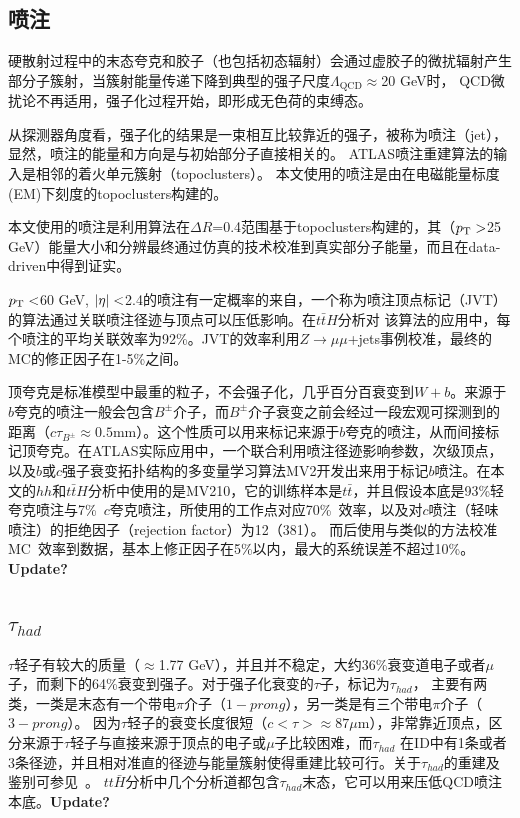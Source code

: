 \subsection{喷注}\label{subsec:jet_reco}
硬散射过程中的末态夸克和胶子（也包括初态辐射）会通过虚胶子的微扰辐射产生部分子簇射，当簇射能量传递下降到典型的强子尺度$\Lambda_{\text{QCD}}\approx$20 GeV时，%
QCD微扰论不再适用，强子化过程开始，即形成无色荷的束缚态。

从探测器角度看，强子化的结果是一束相互比较靠近的强子，被称为喷注（jet），显然，喷注的能量和方向是与初始部分子直接相关的。
ATLAS喷注重建算法的输入是相邻的着火单元簇射（topoclusters）\cite{Aad:2016upy}。
本文使用的喷注是由在电磁能量标度(EM)下刻度的topoclusters构建的。

本文使用的喷注是利用\antikt 算法\cite{Cacciari:2008gp}在$\Delta R$=0.4范围基于topoclusters构建的，其（$p_{\text{T}}>$25 GeV）能量大小和分辨最终通过仿真的技术校准到真实部分子能量，而且在data-driven中得到证实\cite{TheATLAScollaboration:2015soq,TheATLAScollaboration:2013pia}。

$p_{\text{T}}<$60 GeV, $|\eta|<$2.4的喷注有一定概率的来自\pileup ，一个称为喷注顶点标记（JVT）\cite{ATLAS:2014cva}的算法通过关联喷注径迹与顶点可以压低\pileup 影响。在$t\bar{t}H$分析对
该算法的应用中，每个喷注的平均关联效率为92\%。JVT的效率利用$Z\rightarrow \mu\mu$+jets事例校准，最终的MC的修正因子在1-5\%之间。

顶夸克是标准模型中最重的粒子，不会强子化，几乎百分百衰变到$W+b$。来源于$b$夸克的喷注一般会包含$B^{\pm}$介子，而$B^{\pm}$介子衰变之前会经过一段宏观可探测到的距离（$c\tau_{B^{\pm}}\approx0.5\text{mm}$）。这个性质可以用来标记来源于$b$夸克的喷注，从而间接标记顶夸克。在ATLAS实际应用中，一个联合利用喷注径迹影响参数，次级顶点，
以及$b$或$c$强子衰变拓扑结构的多变量学习算法MV2\cite{ATL-PHYS-PUB-2015-022,ATL-PHYS-PUB-2016-012}开发出来用于标记$b$喷注。在本文的$hh$和$t\bar{t}H$分析中使用的是MV210，它的训练样本是$t\bar{t}$，并且假设本底是93\%轻
夸克喷注与7\%~$c$夸克喷注，所使用的工作点对应70\%~\btag 效率，以及对$c$喷注（轻味喷注）的拒绝因子（rejection factor）为12（381）。
而后使用与\RunOne 类似的方法\cite{Aad:2015ydr}校准MC~\btag 效率到数据，基本上修正因子在5\%以内，最大的系统误差不超过10\%。\textbf{Update?}

\subsection{$\tau_{had}$}
$\tau$轻子有较大的质量（$\approx$1.77 GeV），并且并不稳定，大约36\%衰变道电子或者$\mu$子，而剩下的64\%衰变到强子。对于强子化衰变的$\tau$子，标记为$\tau_{had}$，
主要有两类，一类是末态有一个带电$\pi$介子（$1-prong$），另一类是有三个带电$\pi$介子（$3-prong$）。
因为$\tau$轻子的衰变长度很短（$c<\tau>\approx87\mu$m），非常靠近顶点，区分来源于$\tau$轻子与直接来源于顶点的电子或$\mu$子比较困难，而$\tau_{had}$
在ID中有1条或者3条径迹，并且相对准直的径迹与能量簇射使得重建比较可行。关于$\tau_{had}$的重建及鉴别可参见~\cite{ATL-PHYS-PUB-2015-045}。
$tt\bar{H}$分析中几个分析道都包含$\tau_{had}$末态，它可以用来压低QCD喷注本底。\textbf{Update?}

